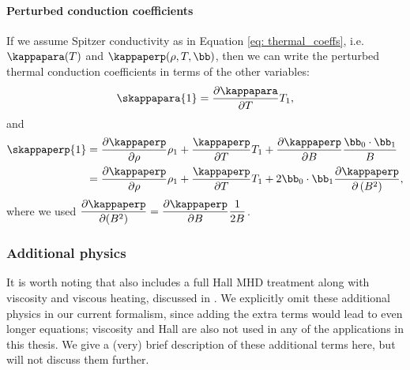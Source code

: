 \paragraph{Perturbed conduction coefficients} If we assume Spitzer conductivity as in Equation \eqref{eq: thermal_coeffs}, i.e. $\kappapara(T)$ and $\kappaperp(\rho, T, \bb)$, then we can write the perturbed thermal conduction coefficients in terms of the other variables:
\begin{equation} \label{eq: short kappapara1}
  \skappapara{1} = \frac{\partial \kappapara}{\partial T} T_1,
\end{equation}
and
\begin{equation} \label{eq: short kappaperp1}
  \begin{aligned}
    \skappaperp{1} &=
      \frac{\partial \kappaperp}{\partial \rho}\rho_1
      + \frac{\kappaperp}{\partial T}T_1
      + \frac{\partial \kappaperp}{\partial B}\frac{\bb_0 \cdot \bb_1}{B} \\
    &= \frac{\partial \kappaperp}{\partial \rho}\rho_1
      + \frac{\kappaperp}{\partial T}T_1
      + 2\bb_0\cdot\bb_1 \frac{\partial \kappaperp}{\partial\left(B^2\right)},
  \end{aligned}
\end{equation}
where we used $\dfrac{\partial \kappaperp}{\partial (B^2)} = \dfrac{\partial \kappaperp}{\partial B}\dfrac{1}{2B}$.

\subsubsection{Additional physics}
It is worth noting that {\legolas} also includes a full Hall MHD treatment along with viscosity and viscous heating, discussed in \citet{dejonghe2022}. We explicitly omit these additional physics in our current formalism, since adding the extra terms would lead to even longer equations; viscosity and Hall are also not used in any of the applications in this thesis. We give a (very) brief description of these additional terms here, but will not discuss them further.


